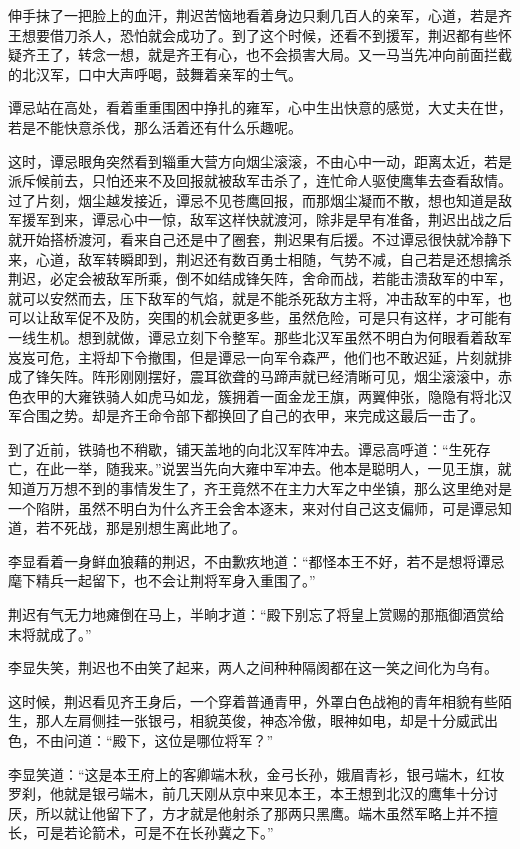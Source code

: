 伸手抹了一把脸上的血汗，荆迟苦恼地看着身边只剩几百人的亲军，心道，若是齐王想要借刀杀人，恐怕就会成功了。到了这个时候，还看不到援军，荆迟都有些怀疑齐王了，转念一想，就是齐王有心，也不会损害大局。又一马当先冲向前面拦截的北汉军，口中大声呼喝，鼓舞着亲军的士气。

谭忌站在高处，看着重重围困中挣扎的雍军，心中生出快意的感觉，大丈夫在世，若是不能快意杀伐，那么活着还有什么乐趣呢。

这时，谭忌眼角突然看到辎重大营方向烟尘滚滚，不由心中一动，距离太近，若是派斥候前去，只怕还来不及回报就被敌军击杀了，连忙命人驱使鹰隼去查看敌情。过了片刻，烟尘越发接近，谭忌不见苍鹰回报，而那烟尘凝而不散，想也知道是敌军援军到来，谭忌心中一惊，敌军这样快就渡河，除非是早有准备，荆迟出战之后就开始搭桥渡河，看来自己还是中了圈套，荆迟果有后援。不过谭忌很快就冷静下来，心道，敌军转瞬即到，荆迟还有数百勇士相随，气势不减，自己若是还想擒杀荆迟，必定会被敌军所乘，倒不如结成锋矢阵，舍命而战，若能击溃敌军的中军，就可以安然而去，压下敌军的气焰，就是不能杀死敌方主将，冲击敌军的中军，也可以让敌军促不及防，突围的机会就更多些，虽然危险，可是只有这样，才可能有一线生机。想到就做，谭忌立刻下令整军。那些北汉军虽然不明白为何眼看着敌军岌岌可危，主将却下令撤围，但是谭忌一向军令森严，他们也不敢迟延，片刻就排成了锋矢阵。阵形刚刚摆好，震耳欲聋的马蹄声就已经清晰可见，烟尘滚滚中，赤色衣甲的大雍铁骑人如虎马如龙，簇拥着一面金龙王旗，两翼伸张，隐隐有将北汉军合围之势。却是齐王命令部下都换回了自己的衣甲，来完成这最后一击了。

到了近前，铁骑也不稍歇，铺天盖地的向北汉军阵冲去。谭忌高呼道：“生死存亡，在此一举，随我来。”说罢当先向大雍中军冲去。他本是聪明人，一见王旗，就知道万万想不到的事情发生了，齐王竟然不在主力大军之中坐镇，那么这里绝对是一个陷阱，虽然不明白为什么齐王会舍本逐末，来对付自己这支偏师，可是谭忌知道，若不死战，那是别想生离此地了。

李显看着一身鲜血狼藉的荆迟，不由歉疚地道：“都怪本王不好，若不是想将谭忌麾下精兵一起留下，也不会让荆将军身入重围了。”

荆迟有气无力地瘫倒在马上，半晌才道：“殿下别忘了将皇上赏赐的那瓶御酒赏给末将就成了。”

李显失笑，荆迟也不由笑了起来，两人之间种种隔阂都在这一笑之间化为乌有。

这时候，荆迟看见齐王身后，一个穿着普通青甲，外罩白色战袍的青年相貌有些陌生，那人左肩侧挂一张银弓，相貌英俊，神态冷傲，眼神如电，却是十分威武出色，不由问道：“殿下，这位是哪位将军？”

李显笑道：“这是本王府上的客卿端木秋，金弓长孙，娥眉青衫，银弓端木，红妆罗刹，他就是银弓端木，前几天刚从京中来见本王，本王想到北汉的鹰隼十分讨厌，所以就让他留下了，方才就是他射杀了那两只黑鹰。端木虽然军略上并不擅长，可是若论箭术，可是不在长孙冀之下。”

